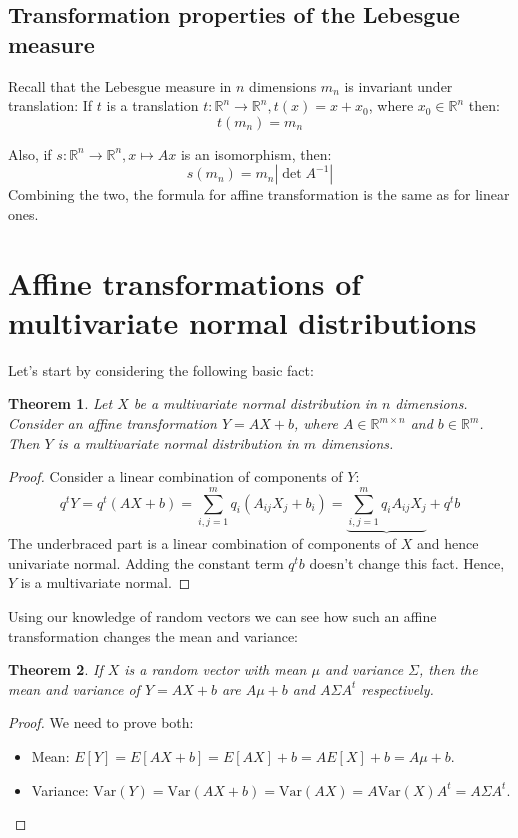 \documentclass[12pt, a4paper]{article}
\newtheorem{theorem}{Theorem}[section]
\numberwithin{equation}{section}
\begin{document}
\subsection{Transformation properties of the Lebesgue measure}
\label{euclidean_lebesgue_properties}
Recall that the Lebesgue measure in $n$ dimensions $m_n$ is invariant under translation: If $t$ is a translation $t:\mathbb{R}^n\rightarrow\mathbb{R}^n, t(x)=x+x_0$, where $x_0\in\mathbb{R}^n$ then:
\begin{equation}
t(m_n)=m_n
\end{equation}

Also, if $s:\mathbb{R}^n\rightarrow\mathbb{R}^n, x\mapsto Ax$ is an isomorphism, then:
\begin{equation}
\label{lebesgue_transform}
s(m_n)=m_n|\det A^{-1}|
\end{equation}
Combining the two, the formula for affine transformation is the same as for linear ones.

\section{Affine transformations of multivariate normal distributions}

Let's start by considering the following basic fact:
\begin{theorem}
Let $X$ be a multivariate normal distribution in $n$ dimensions. Consider an affine transformation $Y=AX+b$, where $A\in\mathbb{R}^{m\times n}$ and $b\in\mathbb{R}^m$. Then $Y$ is a multivariate normal distribution in $m$ dimensions.
\end{theorem}
\begin{proof}
Consider a linear combination of components of $Y$:
\begin{equation}
q^t Y=q^t(AX+b)=\sum_{i,j=1}^m q_i\left(A_{ij}X_j+b_i\right)=\underbrace{\sum_{i,j=1}^m q_i A_{ij}X_j}+q^t b
\end{equation}
The underbraced part is a linear combination of components of $X$ and hence univariate normal. Adding the constant term $q^t b$ doesn't change this fact. Hence, $Y$ is a multivariate normal.
\end{proof}

Using our knowledge of random vectors we can see how such an affine transformation changes the mean and variance:

\begin{theorem}
If $X$ is a random vector with mean $\mu$ and variance $\Sigma$, then the mean and variance of $Y=AX+b$ are $A\mu+b$ and $A\Sigma A^t$ respectively.
\end{theorem}
\begin{proof}
We need to prove both:
\begin{itemize}
\item Mean: $E[Y]=E[AX+b]=E[AX]+b=A E[X]+b=A\mu+b$.
\item Variance: $\textrm{Var}(Y)=\textrm{Var}(AX+b)=\textrm{Var}(AX)=A\textrm{Var}(X)A^t=A\Sigma A^t$.
\end{itemize}
\end{proof}
\end{document}
